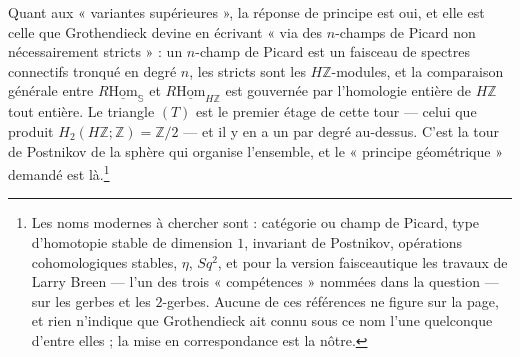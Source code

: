 \documentclass[11pt,a4paper]{article}
\begin{document}
Quant aux « variantes supérieures », la réponse de principe est oui, et elle
est celle que Grothendieck devine en écrivant « via des $n$-champs de Picard
non nécessairement stricts » : un $n$-champ de Picard est un faisceau de
spectres connectifs tronqué en degré $n$, les stricts sont les
$H\mathbb{Z}$-modules, et la comparaison générale entre
$R\underline{\mathrm{Hom}}_{\mathbb{S}}$ et
$R\underline{\mathrm{Hom}}_{H\mathbb{Z}}$ est gouvernée par l'homologie
entière de $H\mathbb{Z}$ tout entière. Le triangle $(T)$ est le premier étage
de cette tour --- celui que produit $H_2(H\mathbb{Z};\mathbb{Z}) =
\mathbb{Z}/2$ --- et il y en a un par degré au-dessus. C'est la tour de
Postnikov de la sphère qui organise l'ensemble, et le « principe géométrique »
demandé est là.\footnote{Les noms modernes à chercher sont : catégorie ou
champ de Picard, type d'homotopie stable de dimension $1$, invariant de
Postnikov, opérations cohomologiques stables, $\eta$, $Sq^2$, et pour la
version faisceautique les travaux de Larry Breen --- l'un des trois
« compétences » nommées dans la question --- sur les gerbes et les $2$-gerbes.
Aucune de ces références ne figure sur la page, et rien n'indique que
Grothendieck ait connu sous ce nom l'une quelconque d'entre elles ; la mise en
correspondance est la nôtre.}
\end{document}
